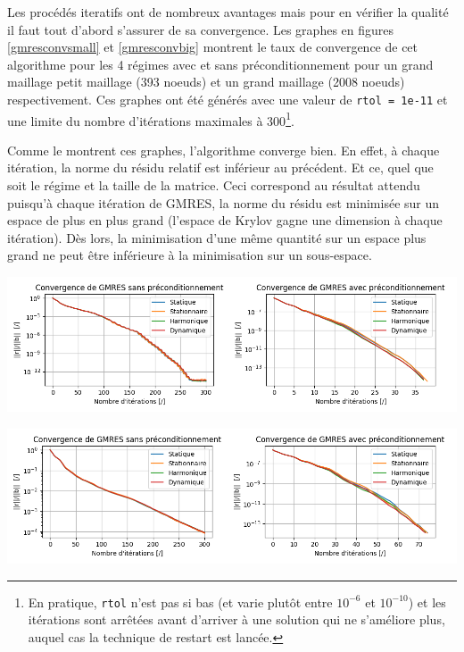 \documentclass[11pt]{article}
\begin{document}
Les procédés iteratifs ont de nombreux avantages mais pour en vérifier la qualité il faut tout d'abord s'assurer de sa convergence. Les graphes en figures \ref{gmresconvsmall} et \ref{gmresconvbig} montrent le taux de convergence de cet algorithme pour les 4 régimes avec et sans préconditionnement pour un grand maillage petit maillage (393 noeuds) et un grand maillage (2008 noeuds) respectivement. Ces graphes ont été générés avec une valeur de \texttt{rtol = 1e-11} et une limite du nombre d'itérations maximales à 300\footnote{En pratique, \texttt{rtol} n'est pas si bas (et varie plutôt entre $10^{-6}$ et $10^{-10}$) et les itérations sont arrêtées avant d'arriver à une solution qui ne s'améliore plus, auquel cas la technique de restart est lancée.}.\\[10pt]
\begin{minipage}{0.35\textwidth}
   
   Comme le montrent ces graphes, l'algorithme converge bien. En effet, à chaque itération, la norme du résidu relatif est inférieur au précédent. Et ce, quel que soit le régime et la taille de la matrice. Ceci correspond au résultat attendu puisqu'à chaque itération de GMRES, la norme du résidu est minimisée sur un espace de plus en plus grand (l'espace de Krylov gagne une dimension à chaque itération). Dès lors, la minimisation d'une même quantité sur un espace plus grand ne peut être inférieure à la minimisation sur un sous-espace. \\
\end{minipage}
\begin{minipage}{0.65 \linewidth}
    \centering
    \includegraphics[width=\linewidth]{gmres_conv_small.png}
    \label{gmresconvsmall}
        
    \centering
    \includegraphics[width=\linewidth]{gmres_conv_big.png}
    \label{gmresconvbig}
\end{minipage}
\end{document}
